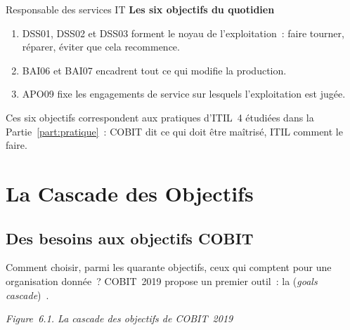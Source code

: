 \begin{boxmetier}{Responsable des services IT}
\textbf{Les six objectifs du quotidien}
\begin{enumerate}
    \item DSS01, DSS02 et DSS03 forment le noyau de l'exploitation~:
          faire tourner, réparer, éviter que cela recommence.
    \item BAI06 et BAI07 encadrent tout ce qui modifie la production.
    \item APO09 fixe les engagements de service sur lesquels l'exploitation
          est jugée.
\end{enumerate}
Ces six objectifs correspondent aux pratiques d'ITIL~4 étudiées dans la
Partie~\ref{part:pratique}~: COBIT dit ce qui doit être maîtrisé, ITIL
comment le faire.
\end{boxmetier}

\section{La Cascade des Objectifs}
\label{sec:c06-cascade}

\subsection{Des besoins aux objectifs COBIT}

Comment choisir, parmi les quarante objectifs, ceux qui comptent pour une
organisation donnée~? COBIT~2019 propose un premier outil~: la
(\textit{goals cascade})~\cite{isaca2018cobitintro}.

\noindent\begin{minipage}{\linewidth}
\begin{center}
\end{center}
\vspace{-0.4em}
\begin{center}{\small\itshape Figure~6.1. La cascade des objectifs de
COBIT~2019}\end{center}
\end{minipage}

